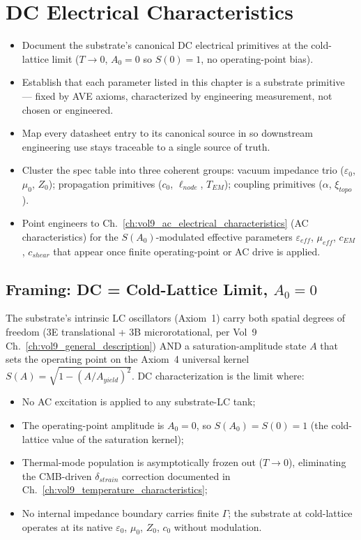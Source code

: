 \chapter{DC Electrical Characteristics}
\label{ch:vol9_dc_electrical_characteristics}

\begin{objectivebox}
\begin{itemize}
    \item Document the substrate's canonical DC electrical primitives at the cold-lattice limit ($T \to 0$, $A_0 = 0$ so $S(0) = 1$, no operating-point bias).
    \item Establish that each parameter listed in this chapter is a substrate primitive --- fixed by AVE axioms, characterized by engineering measurement, not chosen or engineered.
    \item Map every datasheet entry to its canonical source in  so downstream engineering use stays traceable to a single source of truth.
    \item Cluster the spec table into three coherent groups: vacuum impedance trio ($\varepsilon_0$, $\mu_0$, $Z_0$); propagation primitives ($c_0$, $\ell_{node}$, $T_{EM}$); coupling primitives ($\alpha$, $\xi_{topo}$).
    \item Point engineers to Ch.~\ref{ch:vol9_ac_electrical_characteristics} (AC characteristics) for the $S(A_0)$-modulated effective parameters $\varepsilon_{eff}$, $\mu_{eff}$, $c_{EM}$, $c_{shear}$ that appear once finite operating-point or AC drive is applied.
\end{itemize}
\end{objectivebox}

\section{Framing: DC = Cold-Lattice Limit, $A_0 = 0$}
\label{sec:vol9_dc_framing}

The substrate's intrinsic LC oscillators (Axiom~1) carry both spatial degrees of freedom (3E translational + 3B microrotational, per Vol~9 Ch.~\ref{ch:vol9_general_description}) AND a saturation-amplitude state $A$ that sets the operating point on the Axiom~4 universal kernel $S(A) = \sqrt{1 - (A/A_{yield})^2}$. DC characterization is the limit where:

\begin{itemize}
    \item No AC excitation is applied to any substrate-LC tank;
    \item The operating-point amplitude is $A_0 = 0$, so $S(A_0) = S(0) = 1$ (the cold-lattice value of the saturation kernel);
    \item Thermal-mode population is asymptotically frozen out ($T \to 0$), eliminating the CMB-driven $\delta_{strain}$ correction documented in Ch.~\ref{ch:vol9_temperature_characteristics};
    \item No internal impedance boundary carries finite $\Gamma$; the substrate at cold-lattice operates at its native $\varepsilon_0$, $\mu_0$, $Z_0$, $c_0$ without modulation.
\end{itemize}

